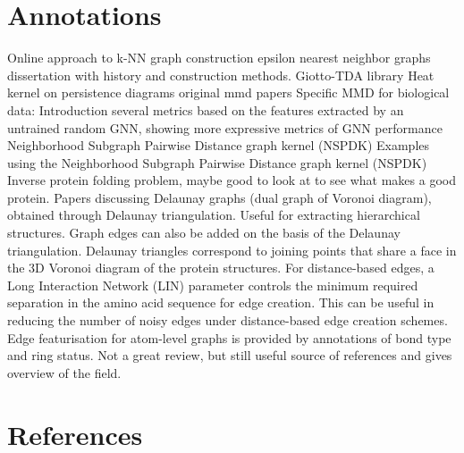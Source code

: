 \documentclass[12pt]{article}
\begin{document}
\section{Annotations}
\label{sec:org0a5e2f1}
Online approach to k-NN graph construction
epsilon nearest neighbor graphs dissertation with history and construction methods.
Giotto-TDA library
Heat kernel on persistence diagrams
original mmd papers
Specific MMD for biological data:
Introduction several metrics based on the features extracted by an untrained random GNN, showing more expressive metrics of GNN performance
Neighborhood Subgraph Pairwise Distance graph kernel (NSPDK)
Examples using the Neighborhood Subgraph Pairwise Distance graph kernel (NSPDK)
Inverse protein folding problem, maybe good to look at to see what makes a good protein.
Papers discussing Delaunay graphs (dual graph of Voronoi diagram), obtained through Delaunay triangulation. Useful for extracting hierarchical structures. Graph edges can also be added on the basis of the Delaunay triangulation. Delaunay triangles correspond to joining points that share a face in the 3D Voronoi diagram of the protein structures. For distance-based edges, a Long Interaction Network (LIN) parameter controls the minimum required separation in the amino acid sequence for edge creation. This can be useful in reducing the number of noisy edges under distance-based edge creation schemes. Edge featurisation for atom-level graphs is provided by annotations of bond type and ring status.
Not a great review, but still useful source of references and gives overview of the field.
\section*{References}
\label{sec:org8fed4c4}
\printbibliography
\end{document}
